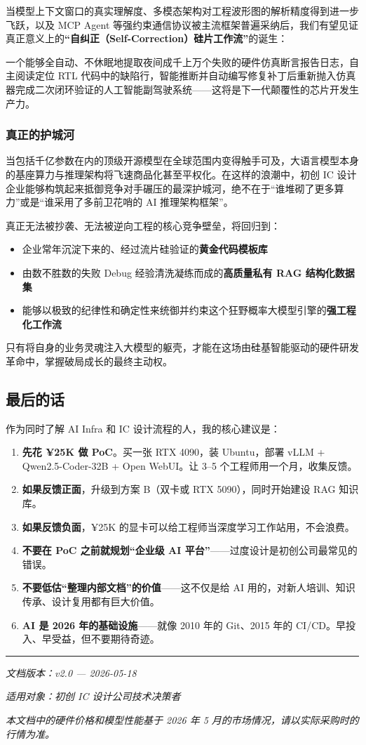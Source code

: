 \documentclass[UTF8,a4paper,10pt,oneside]{ctexart}
\begin{document}
当模型上下文窗口的真实理解度、多模态架构对工程波形图的解析精度得到进一步飞跃，以及 MCP Agent 等强约束通信协议被主流框架普遍采纳后，我们有望见证真正意义上的\textbf{“自纠正（Self-Correction）硅片工作流”}的诞生：

一个能够全自动、不休眠地提取夜间成千上万个失败的硬件仿真断言报告日志，自主阅读定位 RTL 代码中的缺陷行，智能推断并自动编写修复补丁后重新抛入仿真器完成二次闭环验证的人工智能副驾驶系统——这将是下一代颠覆性的芯片开发生产力。

\subsubsection{真正的护城河}

当包括千亿参数在内的顶级开源模型在全球范围内变得触手可及，大语言模型本身的基座算力与推理架构将飞速商品化甚至平权化。在这样的浪潮中，初创 IC 设计企业能够构筑起来抵御竞争对手碾压的最深护城河，绝不在于“谁堆砌了更多算力”或是“谁采用了多前卫花哨的 AI 推理架构框架”。

真正无法被抄袭、无法被逆向工程的核心竞争壁垒，将回归到：
\begin{itemize}
    \item 企业常年沉淀下来的、经过流片硅验证的\textbf{黄金代码模板库}
    \item 由数不胜数的失败 Debug 经验清洗凝练而成的\textbf{高质量私有 RAG 结构化数据集}
    \item 能够以极致的纪律性和确定性来统御并约束这个狂野概率大模型引擎的\textbf{强工程化工作流}
\end{itemize}

只有将自身的业务灵魂注入大模型的躯壳，才能在这场由硅基智能驱动的硬件研发革命中，掌握破局成长的最终主动权。

\subsection{最后的话}

作为同时了解 AI Infra 和 IC 设计流程的人，我的核心建议是：

\begin{enumerate}
    \item \textbf{先花 ¥25K 做 PoC}。买一张 RTX 4090，装 Ubuntu，部署 vLLM + Qwen2.5-Coder-32B + Open WebUI。让 3--5 个工程师用一个月，收集反馈。
    \item \textbf{如果反馈正面}，升级到方案 B（双卡或 RTX 5090），同时开始建设 RAG 知识库。
    \item \textbf{如果反馈负面}，¥25K 的显卡可以给工程师当深度学习工作站用，不会浪费。
    \item \textbf{不要在 PoC 之前就规划“企业级 AI 平台”}——过度设计是初创公司最常见的错误。
    \item \textbf{不要低估“整理内部文档”的价值}——这不仅是给 AI 用的，对新人培训、知识传承、设计复用都有巨大价值。
    \item \textbf{AI 是 2026 年的基础设施}——就像 2010 年的 Git、2015 年的 CI/CD。早投入、早受益，但不要期待奇迹。
\end{enumerate}

\vspace{1em}
\begin{center}
\rule{0.5\textwidth}{0.4pt}

\textit{文档版本：v2.0 — 2026-05-18}

\textit{适用对象：初创 IC 设计公司技术决策者}

\textit{本文档中的硬件价格和模型性能基于 2026 年 5 月的市场情况，请以实际采购时的行情为准。}
\end{center}
\end{document}
